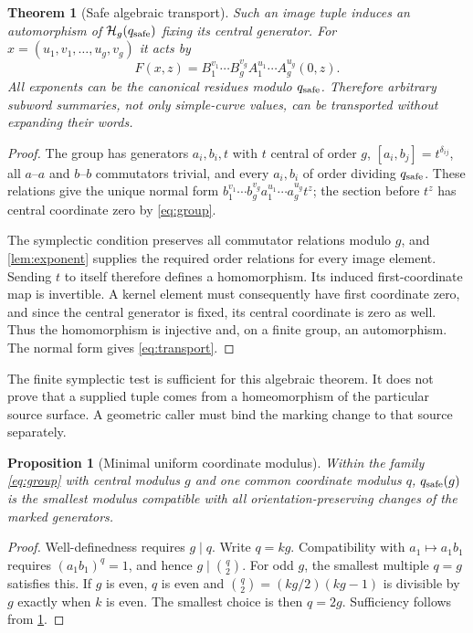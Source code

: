 \documentclass[11pt,letterpaper]{article}
\newtheorem{theorem}{Theorem}[section]
\newtheorem{proposition}[proposition]{Proposition}
\theoremstyle{definition}
\theoremstyle{remark}
\newcommand{\HH}{\mathcal H}
\begin{document}
\begin{theorem}[Safe algebraic transport]\label{thm:transport}
Such an image tuple induces an automorphism of $\HH_g(q_{\rm safe})$ fixing its central generator. For $x=(u_1,v_1,\ldots,u_g,v_g)$ it acts by
\begin{equation}\label{eq:transport}
 F(x,z)=B_1^{v_1}\cdots B_g^{v_g}
         A_1^{u_1}\cdots A_g^{u_g}(0,z).
\end{equation}
All exponents can be the canonical residues modulo $q_{\rm safe}$. Therefore arbitrary subword summaries, not only simple-curve values, can be transported without expanding their words.
\end{theorem}
\begin{proof}
The group has generators $a_i,b_i,t$ with $t$ central of order $g$,
$[a_i,b_j]=t^{\delta_{ij}}$, all $a$--$a$ and $b$--$b$ commutators trivial, and every $a_i,b_i$ of order dividing $q_{\rm safe}$. These relations give the unique normal form
$b_1^{v_1}\cdots b_g^{v_g}a_1^{u_1}\cdots a_g^{u_g}t^z$;
the section before $t^z$ has central coordinate zero by \eqref{eq:group}.

The symplectic condition preserves all commutator relations modulo $g$, and \cref{lem:exponent} supplies the required order relations for every image element. Sending $t$ to itself therefore defines a homomorphism. Its induced first-coordinate map is invertible. A kernel element must consequently have first coordinate zero, and since the central generator is fixed, its central coordinate is zero as well. Thus the homomorphism is injective and, on a finite group, an automorphism. The normal form gives \eqref{eq:transport}.
\end{proof}

The finite symplectic test is sufficient for this algebraic theorem. It does not prove that a supplied tuple comes from a homeomorphism of the particular source surface. A geometric caller must bind the marking change to that source separately.

\begin{proposition}[Minimal uniform coordinate modulus]\label{prop:safeminimal}
Within the family \eqref{eq:group} with central modulus $g$ and one common coordinate modulus $q$, $q_{\rm safe}(g)$ is the smallest modulus compatible with all orientation-preserving changes of the marked generators.
\end{proposition}
\begin{proof}
Well-definedness requires $g\mid q$. Write $q=kg$. Compatibility with $a_1\mapsto a_1b_1$ requires $(a_1b_1)^q=1$, and hence $g\mid\binom q2$. For odd $g$, the smallest multiple $q=g$ satisfies this. If $g$ is even, $q$ is even and
$\binom q2=(kg/2)(kg-1)$ is divisible by $g$ exactly when $k$ is even. The smallest choice is then $q=2g$. Sufficiency follows from \cref{thm:transport}.
\end{proof}
\end{document}

